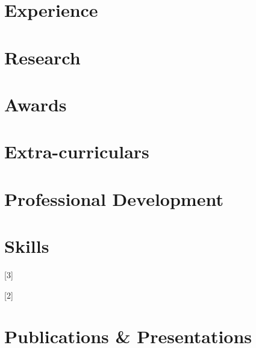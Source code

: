 \documentclass{resume} %
\begin{document}
\section{Experience}

\section{Research}

\section{Awards}

\section{Extra-curriculars}

\section{Professional Development}

\section{Skills}

[3]

[2]


\section{Publications \& Presentations}

\footer

\end{document}
